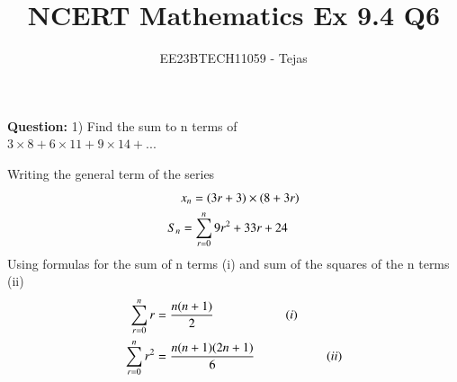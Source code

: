 \documentclass[journal,12pt,twocolumn]{IEEEtran}
\theoremstyle{remark}
\begin{document}

\vspace{3cm}

\title{NCERT Mathematics Ex 9.4 Q6}
\author{EE23BTECH11059 - Tejas$^{}$%
}
\maketitle
\newpage
\textbf{Question:}
1) Find the sum to n terms of\\$3 \times 8 + 6 \times 11 + 9 \times 14 + ...$
        

    
    \solution
        
        Writing the general term of the series
        \begin{align}
            &x_n=(3r+3)\times(8+3r) \notag \\
            S_n&=\sum_{r=0}^{n}9r^2+33r+24 
        \end{align}
        Using formulas for the sum of n terms (i) and sum of the squares of the n terms (ii) \\
          \begin{align}
            \sum_{r=0}^{n}r&=\frac{n(n+1)}{2} \hspace{2cm}(i)\notag \\
            \sum_{r=0}^{n}r^2&=\frac{n(n+1)(2n+1)}{6} \hspace{2cm}(ii)\notag 
        \end{align}
        
\end{document}
